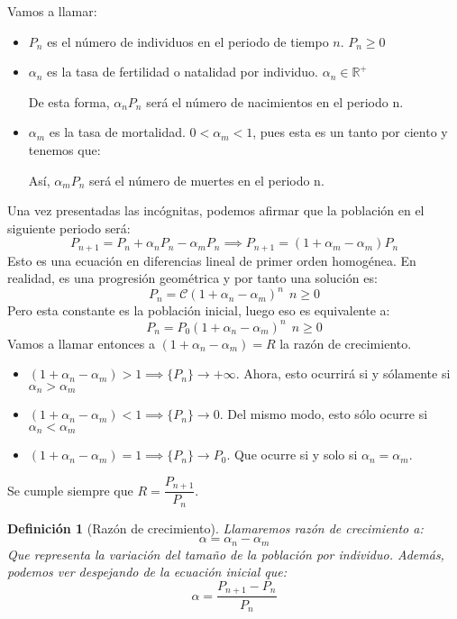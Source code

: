 \documentclass[11pt, a4paper, titlepage]{article}
\newcommand{\R}{\mathbb{R}}
\theoremstyle{theorem-style}
\theoremstyle{definition-style}
\newtheorem*{ndef}{Definición}
\theoremstyle{remark-style}
\theoremstyle{example-style}
\begin{document}
Vamos a llamar:
\begin{itemize}
	\item $P_n$ es el número de individuos en el periodo de tiempo $n$. $P_n\geq 0 $
	\item $\alpha_n$ es la tasa de fertilidad o natalidad por individuo. $\alpha_n \in \R^+$
	
	De esta forma, $\alpha_n P_n$ será el número de nacimientos en el periodo n.
	\item $\alpha_m$ es la tasa de mortalidad. $0 < \alpha_m < 1$, pues esta es un tanto por ciento y tenemos que:
	
	Así, $\alpha_m P_n$ será el número de muertes en el periodo n.
\end{itemize}

Una vez presentadas las incógnitas, podemos afirmar que la población en el siguiente periodo será:
\[
P_{n+1} = P_n + \alpha_n P_n - \alpha_m P_n \implies P_{n+1}=(1+\alpha_m-\alpha_m)P_n
\]
Esto es una ecuación en diferencias lineal de primer orden homogénea. En realidad, es una progresión geométrica y por tanto una solución es:
\[
P_n =\mathcal{C} (1+\alpha_n-\alpha_m)^n \ \ n \geq 0
\]
Pero esta constante es la población inicial, luego eso es equivalente a:
\[
P_n =P_0 (1+\alpha_n-\alpha_m)^n \ \ n \geq 0
\]
Vamos a llamar entonces a $(1+\alpha_n-\alpha_m) = R$ la razón de crecimiento.
\begin{itemize}
	\item $(1+\alpha_n-\alpha_m) > 1 \implies \{P_n\}\to +\infty$. Ahora, esto ocurrirá si y sólamente si $\alpha_n > \alpha_m$
	
	\item $(1+\alpha_n-\alpha_m) < 1 \implies \{P_n\}\to 0$. Del mismo modo, esto sólo ocurre si $\alpha_n < \alpha_m$
	
	\item $(1+\alpha_n-\alpha_m) = 1 \implies \{P_n\} \to P_0$. Que ocurre si y solo si $\alpha_n = \alpha_m$.
\end{itemize}

Se cumple siempre que $R = \dfrac{P_{n+1}}{P_n}$.

\begin{ndef}[Razón de crecimiento]
	Llamaremos razón de crecimiento a:
	\[
	\alpha = \alpha_n - \alpha_m
	\]
	Que representa la variación del tamaño de la población por individuo. Además, podemos ver despejando de la ecuación inicial que:
	\[
	\alpha = \dfrac{P_{n+1}-P_n}{P_n}
	\]
	
\end{ndef}
\end{document}
